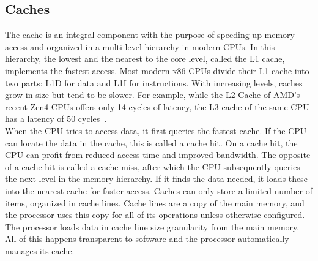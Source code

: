 \subsection{Caches}
\label{sec:state:technical:caches}


The cache is an integral component with the purpose of speeding up memory access
and organized in a multi-level hierarchy in modern CPUs. In this hierarchy, the
lowest and the nearest to the core level, called the L1 cache, implements the
fastest access. Most modern x86 CPUs divide their L1 cache into two parts: L1D
for data and L1I for instructions. With increasing levels, caches grow in size
but tend to be slower. For example, while the L2 Cache of AMD's recent Zen4 CPUs
offers only 14 cycles of latency, the L3 cache of the same CPU has a latency of
50 cycles~\cite{zen4}.\\

When the CPU tries to access data, it first queries the fastest cache. If the
CPU can locate the data in the cache, this is called a cache hit. On a cache
hit, the CPU can profit from reduced access time and improved bandwidth. The
opposite of a cache hit is called a cache miss, after which the CPU subsequently
queries the next level in the memory hierarchy. If it finds the data needed, it
loads these into the nearest cache for faster access. Caches can only store a
limited number of items, organized in cache lines. Cache lines are a copy of the
main memory, and the processor uses this copy for all of its operations unless
otherwise configured. The processor loads data in cache line size granularity
from the main memory. All of this happens transparent to software and the
processor automatically manages its cache. \\

